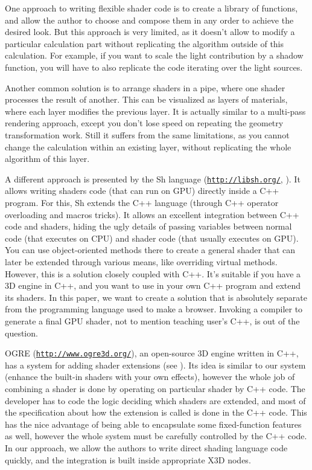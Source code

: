 \documentclass{acmsiggraph}                     %
\newcommand*{\myhref}[2]{\texttt{\href{#1}{\nolinkurl{#2}}}}
\begin{document}
One approach to writing flexible shader code is to create
a library of functions, and allow the author to choose and compose them
in any order to achieve the desired look. But this approach is very limited,
as it doesn't allow to modify a particular calculation part without
replicating the algorithm outside of this calculation.
For example, if you want to scale the light contribution by a shadow function,
you will have to also replicate the code iterating over the light sources.

Another common solution is to arrange shaders in a pipe, where one
shader processes the result of another. This can be visualized as
layers of materials, where each layer modifies the previous
layer. It is actually similar to a multi-pass rendering approach,
except you don't lose speed on repeating the geometry transformation work.
Still it suffers from the same limitations, as you cannot change
the calculation within an existing layer, without replicating the whole
algorithm of this layer.


A different approach is presented by the Sh language (\myhref{http://libsh.org/}{http://libsh.org/}, \cite{sh:book}).
It allows writing shaders code (that can run on GPU) directly inside a
C++ program. For this, Sh extends the C++ language (through C++
operator overloading and macros tricks). It allows an excellent
integration between C++ code and shaders, hiding the ugly details of
passing variables between normal code (that executes on CPU) and
shader code (that usually executes on GPU). You can use
object-oriented methods there to create a general shader that can
later be extended through various means, like overriding virtual
methods. However, this is a solution closely coupled with C++. It's
suitable if you have a 3D engine in C++, and you want to use in your
own C++ program and extend its shaders. In this paper, we want to
create a solution that is absolutely separate from the programming
language used to make a browser. Invoking a compiler to generate a
final GPU shader, not to mention teaching user's C++, is out of the
question.

OGRE (\myhref{http://www.ogre3d.org/}{http://www.ogre3d.org/}), an open-source 3D engine written in C++, has a system
for adding shader extensions (see \cite{ogre:shader}). Its idea is similar
to our system (enhance the built-in shaders with your own effects),
however the whole job of combining a shader is done by operating
on particular shader by C++ code. The developer has to code
the logic deciding which shaders are extended, and most of the specification
about how the extension is called is done in the C++ code.
This has the nice advantage of being able to encapsulate some fixed-function
features as well, however the whole system must be carefully controlled by
the C++ code. In our approach, we allow the authors to write direct shading
language code quickly, and the integration is built inside appropriate X3D nodes.
\end{document}
